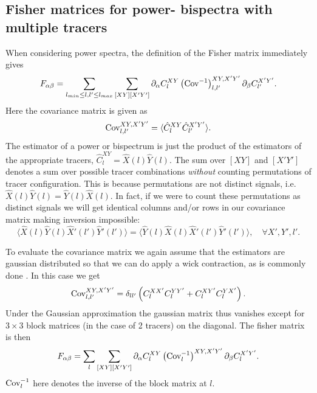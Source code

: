 \documentclass[11pt]{article} %
\DeclareRobustCommand{\Cov}{\ifmmode\text{Cov}\else d\fi}
\newcommand{\br}[1]{\ensuremath{\left( #1 \right)}}
\begin{document}
\subsection{Fisher matrices for power- bispectra with multiple tracers}
When considering power spectra, the definition of the Fisher matrix immediately gives 
\begin{equation*}
    F_{\alpha\beta} = \sum_{l_{min}\leq l, l' \leq l_{max}}\sum_{[XY][X'Y']} \partial_\alpha C_{l}^{XY} \br{\Cov^{-1}}^{XY, X'Y'}_{l, l'} \partial_\beta C^{X'Y'}_{l'}.
\end{equation*}
Here the covariance matrix is given as
\begin{equation*}
    \Cov^{XY, X'Y'}_{l, l'} = \langle \hat C^{XY}_{l} \hat C^{X'Y'}_{l'} \rangle.
\end{equation*}
The estimator of a power or bispectrum is just the product of the estimators of the appropriate tracers, $\hat C^{XY}_{l} = \hat X(l) \hat Y(l)$. The sum over $[XY]$ and $[X'Y']$ denotes a sum over possible tracer combinations \textit{without} counting permutations of tracer configuration. This is because permutations are not distinct signals, i.e. $\hat X(l) \hat Y(l) = \hat Y(l) \hat X(l)$. In fact, if we were to count these permutations as distinct signals we will get identical columns and/or rows in our covariance matrix making inversion impossible:
\begin{equation*}
    \langle \hat X(l) \hat Y (l) \hat X'(l') \hat Y' (l') \rangle = \langle \hat Y (l) \hat X (l) \hat X'(l') \hat Y' (l') \rangle, \quad \forall X', Y', l'. 
\end{equation*}

To evaluate the covariance matrix we again assume that the estimators are gaussian distributed so that we can do apply a wick contraction, as is commonly done \cite{tegmark1997cosmic}. In this case we get
\begin{equation*}
    \Cov^{XY, X'Y'}_{l, l'} = \delta_{ll'}\br{C^{XX'}_lC^{YY'}_l + C^{XY'}_lC^{YX'}_l}.
\end{equation*}
Under the Gaussian approximation the gaussian matrix thus vanishes except for $3\times 3$ block matrices (in the case of 2 tracers) on the diagonal. The fisher matrix is then
\begin{equation*}
    F_{\alpha\beta} = \sum_{l}\sum_{[XY][X'Y']} \partial_\alpha C_{l}^{XY} \br{\Cov^{-1}_l}^{XY, X'Y'} \partial_\beta C^{X'Y'}_{l}.
\end{equation*} 
$\Cov^{-1}_l$ here denotes the inverse of the block matrix at $l$.
\end{document}
